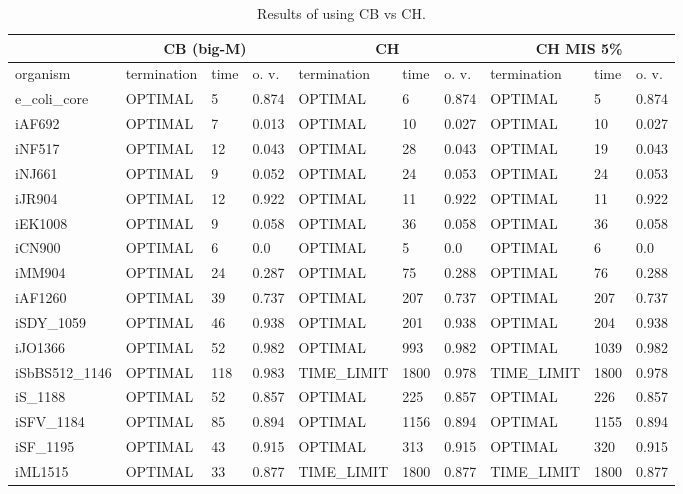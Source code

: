 \begin{table}[!ht]
    \small
    \centering
    \begin{tabular}{|l|l|l|l|l|l|l|l|l|l|}
    \hline
        \multicolumn{1}{|c}{} & \multicolumn{3}{|c|}{CB (big-M)} & \multicolumn{3}{|c|}{CH} & \multicolumn{3}{|c|}{CH MIS 5\%} \\ \hline
        organism & termination & time & o. v. & termination & time & o. v. & termination & time & o. v. \\ \hline
        e\_coli\_core & OPTIMAL & 5 & 0.874 & OPTIMAL & 6 & 0.874 & OPTIMAL & 5 & 0.874 \\ \hline
        iAF692 & OPTIMAL & 7 & 0.013 & OPTIMAL & 10 & 0.027 & OPTIMAL & 10 & 0.027 \\ \hline
        iNF517 & OPTIMAL & 12 & 0.043 & OPTIMAL & 28 & 0.043 & OPTIMAL & 19 & 0.043 \\ \hline
        iNJ661 & OPTIMAL & 9 & 0.052 & OPTIMAL & 24 & 0.053 & OPTIMAL & 24 & 0.053 \\ \hline
        iJR904 & OPTIMAL & 12 & 0.922 & OPTIMAL & 11 & 0.922 & OPTIMAL & 11 & 0.922 \\ \hline
        iEK1008 & OPTIMAL & 9 & 0.058 & OPTIMAL & 36 & 0.058 & OPTIMAL & 36 & 0.058 \\ \hline
        iCN900 & OPTIMAL & 6 & 0.0 & OPTIMAL & 5 & 0.0 & OPTIMAL & 6 & 0.0 \\ \hline
        iMM904 & OPTIMAL & 24 & 0.287 & OPTIMAL & 75 & 0.288 & OPTIMAL & 76 & 0.288 \\ \hline
        iAF1260 & OPTIMAL & 39 & 0.737 & OPTIMAL & 207 & 0.737 & OPTIMAL & 207 & 0.737 \\ \hline
        iSDY\_1059 & OPTIMAL & 46 & 0.938 & OPTIMAL & 201 & 0.938 & OPTIMAL & 204 & 0.938 \\ \hline
        iJO1366 & OPTIMAL & 52 & 0.982 & OPTIMAL & 993 & 0.982 & OPTIMAL & 1039 & 0.982 \\ \hline
        iSbBS512\_1146 & OPTIMAL & 118 & 0.983 & TIME\_LIMIT & 1800 & 0.978 & TIME\_LIMIT & 1800 & 0.978 \\ \hline
        iS\_1188 & OPTIMAL & 52 & 0.857 & OPTIMAL & 225 & 0.857 & OPTIMAL & 226 & 0.857 \\ \hline
        iSFV\_1184 & OPTIMAL & 85 & 0.894 & OPTIMAL & 1156 & 0.894 & OPTIMAL & 1155 & 0.894 \\ \hline
        iSF\_1195 & OPTIMAL & 43 & 0.915 & OPTIMAL & 313 & 0.915 & OPTIMAL & 320 & 0.915 \\ \hline
        iML1515 & OPTIMAL & 33 & 0.877 & TIME\_LIMIT & 1800 & 0.877 & TIME\_LIMIT & 1800 & 0.877 \\ \hline
    \end{tabular}
    \caption{\label{Tab:ch_vs_cb} Results of using CB vs CH.}
\end{table}

